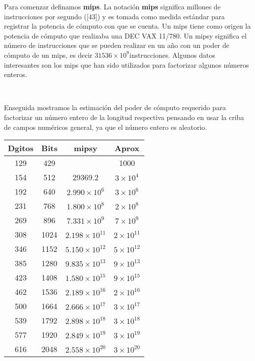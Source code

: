 \documentclass[11pt, conference]{IEEEtran}
\begin{document}
Para comenzar definamos \textbf{mips}. La notación \textbf{mips} significa millones de instrucciones por segundo ([43]) y es tomada como medida estándar para registrar la potencia de cómputo con que se cuenta. Un mips tiene como origen la potencia de cómputo que realizaba una DEC VAX 11/780. Un mipsy significa el número de instrucciones que se pueden realizar en un año con un poder de cómputo de un mips, es decir $31536\times 10^9$instrucciones. Algunos datos interesantes son los mips que han sido utilizados para factorizar algunos números enteros.

\

Enseguida mostramos la estimación del poder de cómputo requerido para factorizar un número entero de la longitud respectiva pensando en usar la criba de campos numéricos general, ya que el número entero es aleatorio.

\begin{table}[htb]
	\begin{center}
		\begin{tabular}{|c|c|c|c|}
			\hline
			Dgitos&Bits&mipsy&Aprox\\
			\hline
			129&429&&1000\\
			\hline
			154&512&29369.2&$3\times10^4$\\
			\hline
			192&640&$2.990\times10^6$&$3\times10^6$\\
			\hline
			231&768&$1.800\times10^8$&$2\times10^8$\\
			\hline
			269&896&$7.331\times10^9$&$7\times10^9$\\
			\hline
			308&1024&$2.198\times10^{11}$&$2\times10^{11}$\\
			\hline
			346&1152&$5.150\times10^{12}$&$5\times10^{12}$\\
			\hline
			385&1280&$9.835\times10^{13}$&$9\times10^{13}$\\
			\hline
			423&1408&$1.580\times10^{15}$&$9\times10^{15}$\\
			\hline
			462&1536&$2.189\times10^{16}$&$2\times10^{16}$\\
			\hline
			500&1664&$2.666\times10^{17}$&$3\times10^{17}$\\
			\hline
			539&1792&$2.898\times10^{18}$&$3\times10^{18}$\\
			\hline
			577&1920&$2.849\times10^{19}$&$3\times10^{19}$\\
			\hline
			616&2048&$2.558\times10^{20}$&$3\times10^{20}$\\
			\hline
		\end{tabular}
	\end{center}
\end{table}
\pagebreak
\end{document}
